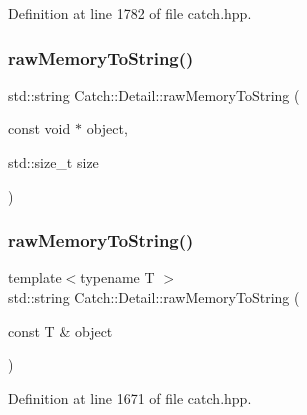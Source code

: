 Definition at line 1782 of file catch.\+hpp.

\hypertarget{namespace_catch_1_1_detail_ac5d6c510e565ee5bddcc2236194ce29e}{}\label{namespace_catch_1_1_detail_ac5d6c510e565ee5bddcc2236194ce29e} 
\subsubsection{\texorpdfstring{raw\+Memory\+To\+String()}{rawMemoryToString()}\hspace{0.1cm}{\footnotesize\ttfamily [1/2]}}
{\footnotesize\ttfamily std\+::string Catch\+::\+Detail\+::raw\+Memory\+To\+String (\begin{DoxyParamCaption}\item[{const void $\ast$}]{object,  }\item[{std\+::size\+\_\+t}]{size }\end{DoxyParamCaption})}

\hypertarget{namespace_catch_1_1_detail_a371620ed524abfcae5c3772bf49b563a}{}\label{namespace_catch_1_1_detail_a371620ed524abfcae5c3772bf49b563a} 
\subsubsection{\texorpdfstring{raw\+Memory\+To\+String()}{rawMemoryToString()}\hspace{0.1cm}{\footnotesize\ttfamily [2/2]}}
{\footnotesize\ttfamily template$<$typename T $>$ \\
std\+::string Catch\+::\+Detail\+::raw\+Memory\+To\+String (\begin{DoxyParamCaption}\item[{const T \&}]{object }\end{DoxyParamCaption})\hspace{0.3cm}{\ttfamily [inline]}}



Definition at line 1671 of file catch.\+hpp.

\hypertarget{namespace_catch_1_1_detail_aff0ca0f561ad8053654ab27d54486197}{}\label{namespace_catch_1_1_detail_aff0ca0f561ad8053654ab27d54486197} 
